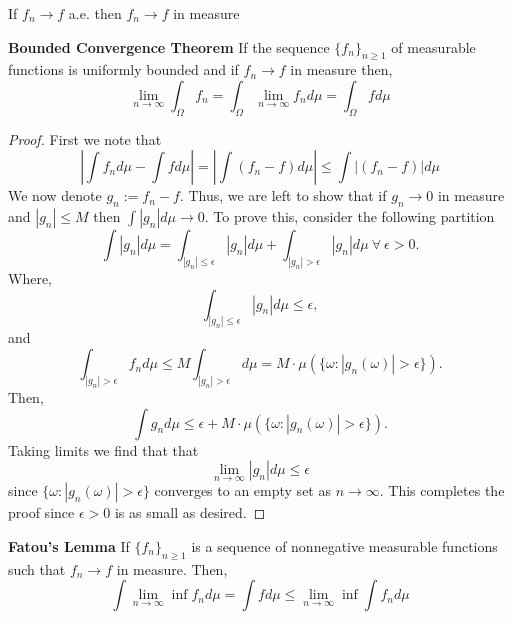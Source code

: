 \documentclass[../TGMAFFIRO.tex]{subfiles}
\begin{document}

\begin{proposition} \label{prop:convergence_ae_measure}
	If $f_n \to f$ a.e. then $f_n \to f$ in measure
\end{proposition}

\begin{theorem} \textbf{Bounded Convergence Theorem}
	If the sequence $\{f_n\}_{n\geq 1}$ of measurable functions is uniformly bounded and if $f_n \to f$ in measure then,
	\begin{equation}
		\lim_{n\to\infty} \int_\Omega f_n = 	\int_\Omega \lim_{n\to\infty} f_n d\mu = \int_\Omega f d\mu
	\end{equation}
\end{theorem}

\begin{proof}
	First we note that
	\[
		|\int f_n d\mu - \int f d\mu| = |\int (f_n - f) d\mu| \leq \int| (f_n - f) | d\mu
	\]
	We now denote $g_n := f_n - f$. Thus, we are left to show that if $g_n \to 0$ in measure and $|g_n| \leq M$ then $\int |g_n| d\mu \to 0$. To prove this, consider the following partition
	\[
		\int|g_n| d\mu = \int_{|g_n| \leq \epsilon}|g_n| d\mu + \int_{|g_n| > \epsilon}|g_n| d\mu \ \forall \ \epsilon > 0.
	\]
	Where,
	\[
		\int_{|g_n| \leq \epsilon} |g_n| d\mu \leq \epsilon,
	\]
	and
	\[
		\int_{|g_n| > \epsilon} f_n d\mu \leq M\int_{|g_n| > \epsilon} d\mu = M\cdot\mu(\{\omega : |g_n(\omega)| > \epsilon\}).
	\]
	Then,
	\begin{equation}
		\int g_n d\mu \leq \epsilon + M\cdot\mu(\{\omega : |g_n(\omega)| > \epsilon\}).
	\end{equation}
	Taking limits we find that that
	\[
		\lim_{n\to\infty} |g_n| d\mu \leq \epsilon
	\]
	since $\{\omega : |g_n(\omega)| > \epsilon\}$ converges to an empty set as $n\to\infty$. This completes the proof since $\epsilon > 0$ is as small as desired.
\end{proof}

\begin{theorem} \label{th:fatous_lemma} \textbf{Fatou's Lemma}
If $\{f_n\}_{n\geq 1}$ is a sequence of nonnegative measurable functions such that $f_n \to f$ in measure. Then,
\begin{equation}
	\int\lim_{n\to\infty}\inf f_n d\mu = \int f d\mu \leq \lim_{n\to\infty}\inf\int f_n d\mu
\end{equation}
\end{theorem}
\end{document}
